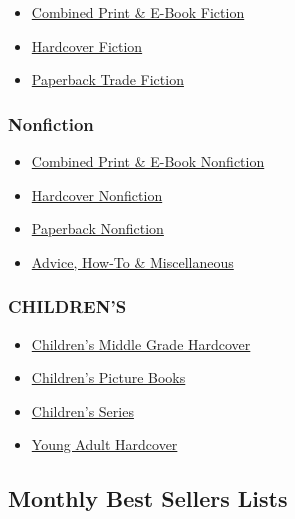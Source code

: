 \begin{itemize}
\tightlist
\item
  \href{/books/best-sellers/combined-print-and-e-book-fiction/}{Combined
  Print \& E-Book Fiction}
\item
  \href{/books/best-sellers/hardcover-fiction/}{Hardcover Fiction}
\item
  \href{/books/best-sellers/trade-fiction-paperback/}{Paperback Trade
  Fiction}
\end{itemize}

\hypertarget{nonfiction}{%
\subsubsection{Nonfiction}\label{nonfiction}}

\begin{itemize}
\tightlist
\item
  \href{/books/best-sellers/combined-print-and-e-book-nonfiction/}{Combined
  Print \& E-Book Nonfiction}
\item
  \href{/books/best-sellers/hardcover-nonfiction/}{Hardcover Nonfiction}
\item
  \href{/books/best-sellers/paperback-nonfiction/}{Paperback Nonfiction}
\item
  \href{/books/best-sellers/advice-how-to-and-miscellaneous/}{Advice,
  How-To \& Miscellaneous}
\end{itemize}

\hypertarget{childrens}{%
\subsubsection{CHILDREN'S}\label{childrens}}

\begin{itemize}
\tightlist
\item
  \href{/books/best-sellers/childrens-middle-grade-hardcover/}{Children's
  Middle Grade Hardcover}
\item
  \href{/books/best-sellers/picture-books/}{Children's Picture Books}
\item
  \href{/books/best-sellers/series-books/}{Children's Series}
\item
  \href{/books/best-sellers/young-adult-hardcover/}{Young Adult
  Hardcover}
\end{itemize}

\hypertarget{monthly-best-sellers-lists}{%
\subsection{Monthly Best Sellers
Lists}\label{monthly-best-sellers-lists}}

